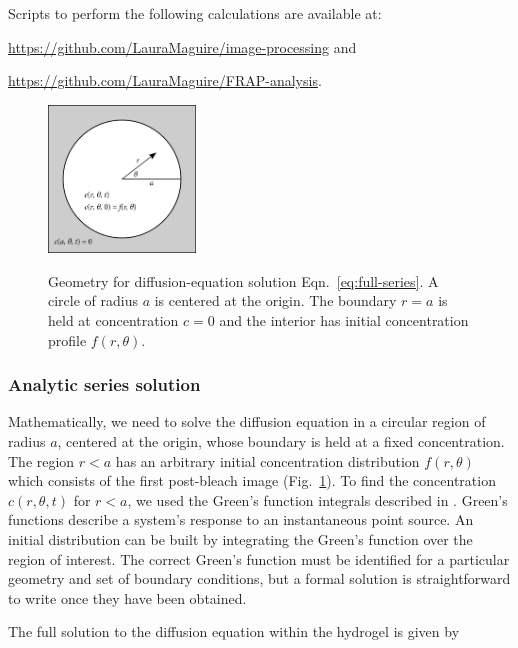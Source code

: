 Scripts to perform the following calculations are available at:

 \url{https://github.com/LauraMaguire/image-processing} and 

\url{https://github.com/LauraMaguire/FRAP-analysis}.

\begin{figure}
\caption[Geometry for Fourier transform solution.]{Geometry for diffusion-equation solution Eqn.~\ref{eq:full-series}.  A circle of radius $a$ is centered at the origin.  The boundary $r=a$ is held at concentration $c=0$ and the interior has initial concentration profile $f(r,\theta)$.}
\centering
\includegraphics[width=0.35\textwidth]{figs/ch04/carslaw-geometry}
\label{fig:carslaw-geo}
\end{figure} 

\subsubsection{Analytic series solution}

Mathematically, we need to solve the diffusion equation in a circular region of radius $a$, centered at the origin, whose boundary is held at a fixed concentration.  The region $r<a$ has an arbitrary initial concentration distribution $f(r,\theta)$ which consists of the first post-bleach image (Fig.~\ref{fig:carslaw-geo}).  To find the concentration $c(r,\theta,t)$ for $r<a$, we used the Green's function integrals described in \cite{h.s.carslaw59}.  Green's functions describe a system's response to an instantaneous point source.  An initial distribution can be built by integrating the Green's function over the region of interest.  The correct Green's function must be identified for a particular geometry and set of boundary conditions, but a formal solution is straightforward to write once they have been obtained.

The full solution to the diffusion equation within the hydrogel is given by \cite{h.s.carslaw59}

